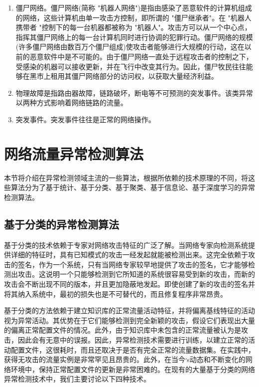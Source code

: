 \begin{enumerate}
    \item 僵尸网络。僵尸网络(简称 "机器人网络")是指由感染了恶意软件的计算机组成的网络，这些计算机由单一攻击方控制，即所谓的 "僵尸继承者"。在 "机器人携带者 "控制下的每一台机器都被称为 "机器人"。攻击方可以从一个中心点，指挥其僵尸网络上的每一台计算机同时进行协调的犯罪行动。僵尸网络的规模(许多僵尸网络由数百万个僵尸组成)使攻击者能够进行大规模的行动，这在以前的恶意软件中是不可能的。由于僵尸网络一直处于远程攻击者的控制之下，受感染的机器可以接收更新，并在飞行中改变其行为。因此，僵尸牧民往往能够在黑市上租用其僵尸网络部分的访问权，以获取大量经济利益。
    
    \item 物理故障是指路由器故障，链路破坏，断电等不可预测的突发事件。该类异常以两种方式影响着网络链路的流量。
    
    \item 突发事件。突发事件往往是正常的网络操作。
\end{enumerate}



\section{网络流量异常检测算法}


本节将介绍在异常检测领域主流的一些算法，根据所依赖的技术原理的不同，将这些算法分为了基于统计、基于分类、基于聚类、基于信息论、基于深度学习的异常检测算法。

\subsection{基于分类的异常检测算法}

基于分类的技术依赖于专家对网络攻击特征的广泛了解。当网络专家向检测系统提供详细的特征时，具有已知模式的攻击一经发起就能被检测出来。这完全依赖于攻击的签名，作为一个系统，只有当网络专家较早地提供了攻击的签名，它才能够检测出攻击。这说明一个只能够检测到它所知道的系统很容易受到新的攻击，而新的攻击会不断出现不同的版本，并且更加隐蔽地发起。即使创建了新的攻击的签名并将其纳入系统中，最初的损失也是不可替代的，而且修复程序非常昂贵。

基于分类的方法依赖于建立知识库的正常流量活动特征，并将偏离基线特征的活动视为异常活动。其优势在于它们能够检测到完全新颖的攻击，假设它们表现出大量的偏离正常配置文件的情况。此外，由于知识库中未包含的正常流量被认为是攻击，因此会有无意中的误报。因此，异常检测技术需要进行训练，以建立正常的活动配置文件，这很耗时，而且还取决于是否有完全正常的流量数据集。在实践中，获得无攻击的流量实例是非常罕见且昂贵的。此外，在当今׳s动态和不断变化的网络环境中，保持正常配置文件的更新是非常困难的。在现有的大量基于分类的网络异常检测技术中，我们主要讨论以下四种技术。

